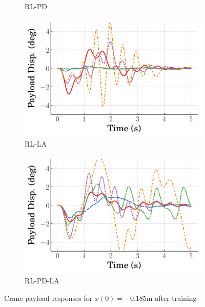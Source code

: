 \begin{figure}[tb]
\begin{subfigure}[b]{0.49\textwidth}
	    \caption{RL-PD}
	    \label{subfig_chap2:dpcrane_neg_payload_resp_300000steps_gain_sched}
    \end{subfigure}
    \hfill
    \begin{subfigure}[b]{0.49\textwidth}
        \centering
        \includegraphics[width=\textwidth]{figures/figures_RL_model_based_control/time_responses_crane/dpcrane_RL_LA/Payload_displacement_-0p185_init_300000_steps.pdf}
        \caption{RL-LA}
        \label{subfig_chap2:dpcrane_neg_payload_resp_300000steps_RL_LA}
    \end{subfigure}
    \hfill
    \begin{subfigure}[b]{0.49\textwidth}
        \centering
        \includegraphics[width=\textwidth]{figures/figures_RL_model_based_control/time_responses_crane/dpcrane_RL_PD_LA/Payload_displacement_-0p185_init_300000_steps.pdf}
        \caption{RL-PD-LA}
        \label{subfig_chap2:dpcrane_neg_payload_resp_300000steps_RL_PD_LA}
    \end{subfigure}
    \hfill
    \caption{Crane payload responses for $x(0)=-0.185\si{\meter}$ after training}
    \label{fig_chap2:dpcrane_neg_payload_resp_300000steps}
\end{figure}
